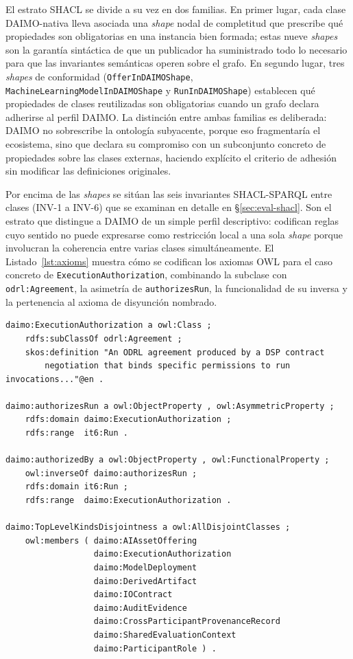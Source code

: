 \documentclass[11pt,a4paper]{article}
\newcommand{\code}[1]{\texttt{#1}}
\begin{document}
El estrato SHACL se divide a su vez en dos familias. En primer lugar, cada clase DAIMO-nativa lleva asociada una \emph{shape} nodal de completitud que prescribe qué propiedades son obligatorias en una instancia bien formada; estas nueve \emph{shapes} son la garantía sintáctica de que un publicador ha suministrado todo lo necesario para que las invariantes semánticas operen sobre el grafo. En segundo lugar, tres \emph{shapes} de conformidad (\code{OfferInDAIMOShape}, \code{MachineLearningModelInDAIMOShape} y \code{RunInDAIMOShape}) establecen qué propiedades de clases reutilizadas son obligatorias cuando un grafo declara adherirse al perfil DAIMO. La distinción entre ambas familias es deliberada: DAIMO no sobrescribe la ontología subyacente, porque eso fragmentaría el ecosistema, sino que declara su compromiso con un subconjunto concreto de propiedades sobre las clases externas, haciendo explícito el criterio de adhesión sin modificar las definiciones originales.

Por encima de las \emph{shapes} se sitúan las seis invariantes SHACL-SPARQL entre clases (INV-1 a INV-6) que se examinan en detalle en §\ref{sec:eval-shacl}. Son el estrato que distingue a DAIMO de un simple perfil descriptivo: codifican reglas cuyo sentido no puede expresarse como restricción local a una sola \emph{shape} porque involucran la coherencia entre varias clases simultáneamente. El Listado~\ref{lst:axioms} muestra cómo se codifican los axiomas OWL para el caso concreto de \code{ExecutionAuthorization}, combinando la subclase con \code{odrl:Agreement}, la asimetría de \code{authorizesRun}, la funcionalidad de su inversa y la pertenencia al axioma de disyunción nombrado.

\begin{lstlisting}[label=lst:axioms,caption={Axiomas centrales alrededor de \code{ExecutionAuthorization}.}]
daimo:ExecutionAuthorization a owl:Class ;
    rdfs:subClassOf odrl:Agreement ;
    skos:definition "An ODRL agreement produced by a DSP contract
        negotiation that binds specific permissions to run invocations..."@en .

daimo:authorizesRun a owl:ObjectProperty , owl:AsymmetricProperty ;
    rdfs:domain daimo:ExecutionAuthorization ;
    rdfs:range  it6:Run .

daimo:authorizedBy a owl:ObjectProperty , owl:FunctionalProperty ;
    owl:inverseOf daimo:authorizesRun ;
    rdfs:domain it6:Run ;
    rdfs:range  daimo:ExecutionAuthorization .

daimo:TopLevelKindsDisjointness a owl:AllDisjointClasses ;
    owl:members ( daimo:AIAssetOffering
                  daimo:ExecutionAuthorization
                  daimo:ModelDeployment
                  daimo:DerivedArtifact
                  daimo:IOContract
                  daimo:AuditEvidence
                  daimo:CrossParticipantProvenanceRecord
                  daimo:SharedEvaluationContext
                  daimo:ParticipantRole ) .
\end{lstlisting}
\end{document}
